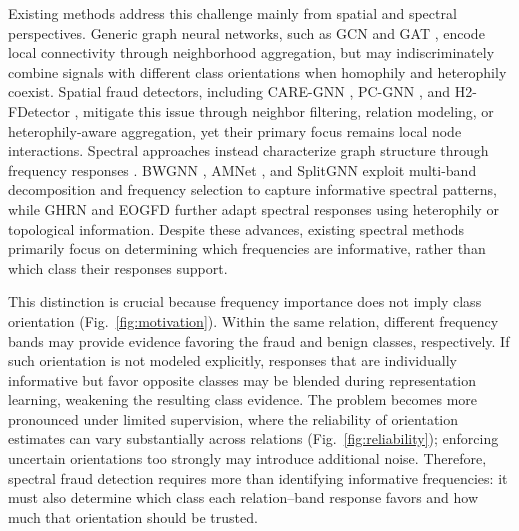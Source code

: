 \documentclass[10pt,journal]{IEEEtran}
\begin{document}
Existing methods address this challenge mainly from spatial and spectral perspectives. Generic graph neural networks, such as GCN \cite{kipf2017gcn} and GAT \cite{velickovic2018gat}, encode local connectivity through neighborhood aggregation, but may indiscriminately combine signals with different class orientations when homophily and heterophily coexist. Spatial fraud detectors, including CARE-GNN \cite{dou2020caregnn}, PC-GNN \cite{liu2021pcgnn}, and H2-FDetector \cite{shi2022h2fdetector}, mitigate this issue through neighbor filtering, relation modeling, or heterophily-aware aggregation, yet their primary focus remains local node interactions. Spectral approaches instead characterize graph structure through frequency responses \cite{shuman2013emerging}. BWGNN \cite{tang2022bwgnn}, AMNet \cite{chai2022amnet}, and SplitGNN \cite{wu2023splitgnn} exploit multi-band decomposition and frequency selection to capture informative spectral patterns, while GHRN \cite{gao2023ghrn} and EOGFD \cite{wang2026eogfd} further adapt spectral responses using heterophily or topological information. Despite these advances, existing spectral methods primarily focus on determining which frequencies are informative, rather than which class their responses support.

This distinction is crucial because frequency importance does not imply class orientation (Fig.~\ref{fig:motivation}). Within the same relation, different frequency bands may provide evidence favoring the fraud and benign classes, respectively. If such orientation is not modeled explicitly, responses that are individually informative but favor opposite classes may be blended during representation learning, weakening the resulting class evidence. The problem becomes more pronounced under limited supervision, where the reliability of orientation estimates can vary substantially across relations (Fig.~\ref{fig:reliability}); enforcing uncertain orientations too strongly may introduce additional noise. Therefore, spectral fraud detection requires more than identifying informative frequencies: it must also determine which class each relation--band response favors and how much that orientation should be trusted.
\end{document}
